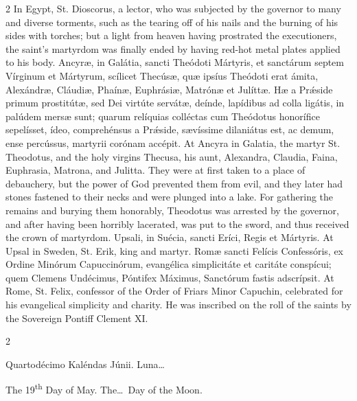 \begin{paracol}{2}
In Egypt, St. Dioscorus, a lector, 
 who was subjected by the governor to many and diverse torments, such as the 
 tearing off of his nails and the burning of his sides with torches; but a 
 light from heaven having prostrated the executioners, the saint's martyrdom 
 was finally ended by having red-hot metal plates applied to his body.
\switchcolumn*
{}
Ancyræ, in Galátia, sancti Theódoti Mártyris, et sanctárum septem Vírginum et Mártyrum, scílicet 
 Thecúsæ, quæ ipsíus Theódoti erat 
 ámita, Alexándræ, Cláudiæ, Phaínæ, 
 Euphrásiæ, Matrónæ et Julíttæ. Hæ a Prǽside primum prostitútæ, sed Dei 
 virtúte servátæ, deínde, lapídibus ad colla ligátis, in palúdem mersæ sunt; quarum relíquias colléctas cum Theódotus honorífice sepelísset, 
 ídeo, 
 comprehénsus a Prǽside, sævíssime dilaniátus est, ac demum, ense percússus, 
 martyrii corónam accépit.
\switchcolumn
{}
At Ancyra in Galatia, the martyr 
 St. Theodotus, and the holy virgins Thecusa, his aunt, Alexandra, Claudia, 
 Faina, Euphrasia, Matrona, and Julitta. They were at first taken to a 
 place of debauchery, but the power of God prevented them from evil, and they 
 later had stones fastened to their necks and were plunged into a lake. 
 For gathering the remains and burying them honorably, Theodotus was arrested 
 by the governor, and after having been horribly lacerated, was put to the 
 sword, and thus received the crown of martyrdom.
\switchcolumn*
{}
Upsali, in Suécia, 
 sancti Eríci, Regis et Mártyris.
\switchcolumn
{}
At Upsal in Sweden, St. Erik, king 
 and martyr.
\switchcolumn*
{}
Romæ sancti Felícis 
 Confessóris, ex Ordine Minórum Capuccinórum, evangélica simplicitáte et 
 caritáte conspícui; quem Clemens Undécimus, Póntifex Máximus, Sanctórum 
 fastis adscrípsit.
\switchcolumn
{}
At Rome, St. Felix, confessor of 
 the Order of Friars Minor Capuchin, celebrated for his evangelical 
 simplicity and charity. He was inscribed on the roll of the saints by 
 the Sovereign Pontiff Clement XI.
\switchcolumn*
{}
\end{paracol}


\begin{paracol}{2}
\begin{center}{\color{gregoriocolor} Quartodécimo Kaléndas Júnii. 
 Luna\dots\ }\end{center}
\switchcolumn
{}
\begin{center}{\color{gregoriocolor} The 
 19\textsuperscript{th} Day of May. The\dots\ Day of the Moon.}\end{center}
\end{paracol}

